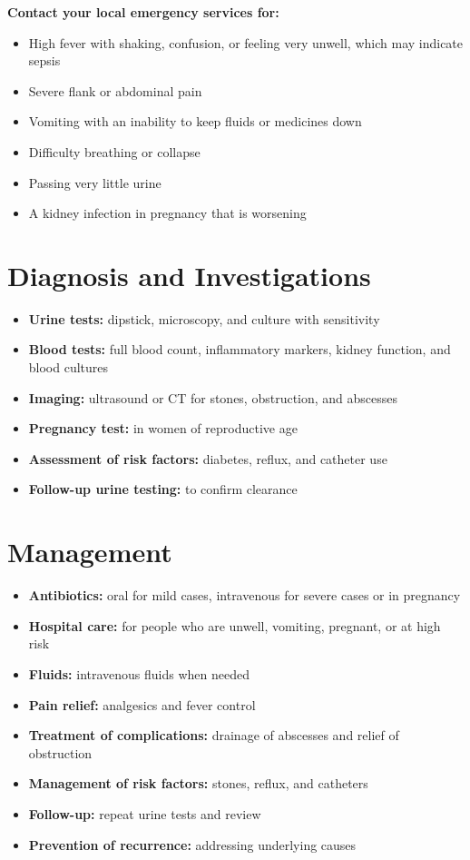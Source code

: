 \textbf{Contact your local emergency services for:}
\begin{itemize}
    \item High fever with shaking, confusion, or feeling very unwell, which may indicate sepsis
    \item Severe flank or abdominal pain
    \item Vomiting with an inability to keep fluids or medicines down
    \item Difficulty breathing or collapse
    \item Passing very little urine
    \item A kidney infection in pregnancy that is worsening
\end{itemize}

\section*{Diagnosis and Investigations}
\begin{itemize}
    \item \textbf{Urine tests:} dipstick, microscopy, and culture with sensitivity
    \item \textbf{Blood tests:} full blood count, inflammatory markers, kidney function, and blood cultures
    \item \textbf{Imaging:} ultrasound or CT for stones, obstruction, and abscesses
    \item \textbf{Pregnancy test:} in women of reproductive age
    \item \textbf{Assessment of risk factors:} diabetes, reflux, and catheter use
    \item \textbf{Follow-up urine testing:} to confirm clearance
\end{itemize}

\section*{Management}
\begin{itemize}
    \item \textbf{Antibiotics:} oral for mild cases, intravenous for severe cases or in pregnancy
    \item \textbf{Hospital care:} for people who are unwell, vomiting, pregnant, or at high risk
    \item \textbf{Fluids:} intravenous fluids when needed
    \item \textbf{Pain relief:} analgesics and fever control
    \item \textbf{Treatment of complications:} drainage of abscesses and relief of obstruction
    \item \textbf{Management of risk factors:} stones, reflux, and catheters
    \item \textbf{Follow-up:} repeat urine tests and review
    \item \textbf{Prevention of recurrence:} addressing underlying causes
\end{itemize}

